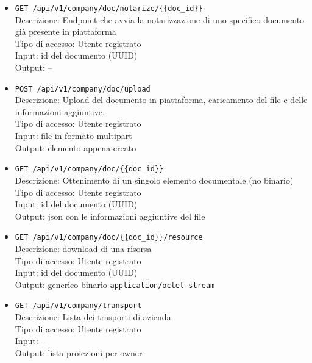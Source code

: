 \documentclass[a4paper,11pt]{article}
\begin{document}
\begin{itemize}
  \item \texttt{GET /api/v1/company/doc/notarize/\{\{doc\_id\}\}}
        \\ Descrizione: Endpoint che avvia la notarizzazione di uno specifico documento già presente in piattaforma
        \\ Tipo di accesso: Utente registrato
        \\ Input: id del documento (UUID)
        \\ Output: --

  \item \texttt{POST /api/v1/company/doc/upload}
        \\ Descrizione: Upload del documento in piattaforma, caricamento del file e delle informazioni aggiuntive.
        \\ Tipo di accesso: Utente registrato
        \\ Input: file in formato multipart
        \\ Output: elemento appena creato

  \item \texttt{GET /api/v1/company/doc/\{\{doc\_id\}\}}
        \\ Descrizione: Ottenimento di un singolo elemento documentale (no binario)
        \\ Tipo di accesso: Utente registrato
        \\ Input: id del documento (UUID)
        \\ Output: json con le informazioni aggiuntive del file

  \item \texttt{GET /api/v1/company/doc/\{\{doc\_id\}\}/resource}
        \\ Descrizione: download di una risorsa
        \\ Tipo di accesso: Utente registrato
        \\ Input: id del documento (UUID)
        \\ Output: generico binario \texttt{application/octet-stream}


  \item \texttt{GET /api/v1/company/transport}
        \\ Descrizione: Lista dei trasporti di azienda
        \\ Tipo di accesso: Utente registrato
        \\ Input: --
        \\ Output: lista proiezioni per owner


\end{itemize}
\end{document}
